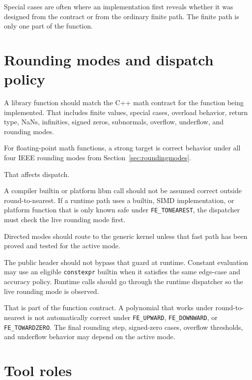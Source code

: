 \documentclass[manuscript, nonacm]{acmart}
\begin{document}
  Special cases are often where an implementation first reveals whether it was
  designed from the contract or from the ordinary finite path. The finite path
  is only one part of the function.



  \section{Rounding modes and dispatch policy}

  A library function should match the C++ math contract for the function being
  implemented. That includes finite values, special cases, overload behavior,
  return type, NaNs, infinities, signed zeros, subnormals, overflow, underflow,
  and rounding modes.

  For floating-point math functions, a strong target is correct behavior under
  all four IEEE rounding modes from Section~\ref{sec:roundingmodes}.

  That affects dispatch.

  A compiler builtin or platform libm call should not be assumed correct
  outside round-to-nearest. If a runtime path uses a builtin, SIMD
  implementation, or platform function that is only known safe under
  \texttt{FE\_TONEAREST}, the dispatcher must check the live rounding mode
  first.

  Directed modes should route to the generic kernel unless that fast path has
  been proved and tested for the active mode.

  The public header should not bypass that guard at runtime. Constant evaluation
  may use an eligible \texttt{constexpr} builtin when it satisfies the same
  edge-case and accuracy policy. Runtime calls should go through the runtime
  dispatcher so the live rounding mode is observed.

  That is part of the function contract. A polynomial that works under
  round-to-nearest is not automatically correct under \texttt{FE\_UPWARD},
  \texttt{FE\_DOWNWARD}, or \texttt{FE\_TOWARDZERO}. The final rounding step,
  signed-zero cases, overflow thresholds, and underflow behavior may depend on
  the active mode.



  \section{Tool roles}
\end{document}
